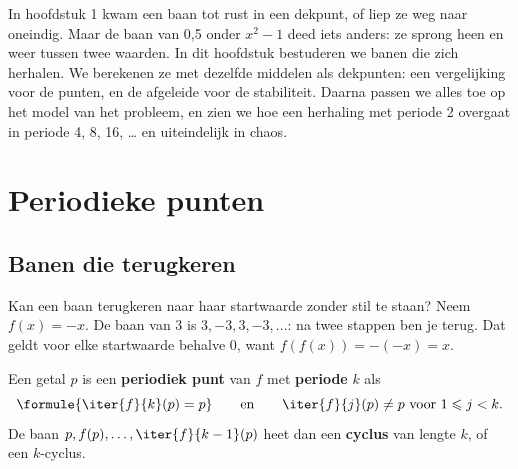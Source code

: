 
In hoofdstuk 1 kwam een baan tot rust in een dekpunt, of liep ze weg naar oneindig. Maar de baan van 0,5 onder $x^2 - 1$ deed iets anders: ze sprong heen en weer tussen twee waarden. In dit hoofdstuk bestuderen we banen die zich herhalen. We berekenen ze met dezelfde middelen als dekpunten: een vergelijking voor de punten, en de afgeleide voor de stabiliteit. Daarna passen we alles toe op het model van het probleem, en zien we hoe een herhaling met periode 2 overgaat in periode 4, 8, 16, \ldots{} en uiteindelijk in chaos.

\begin{oefeningen}[Start]

\end{oefeningen}

\section{Periodieke punten}

\subsection{Banen die terugkeren}

Kan een baan terugkeren naar haar startwaarde zonder stil te staan? Neem $f(x) = -x$. De baan van 3 is $3, -3, 3, -3, \ldots$: na twee stappen ben je terug. Dat geldt voor elke startwaarde behalve 0, want $f(f(x)) = -(-x) = x$.

\begin{theorie}
Een getal $p$ is een \textbf{\textcolor{accent}{periodiek punt}} van $f$ met \textbf{\textcolor{accent}{periode}} $k$ als
\[
\formule{\iter{f}{k}(p) = p} \qquad \text{en} \qquad \iter{f}{j}(p) \neq p \text{ voor } 1 \leqslant j < k .
\]
De baan $p, f(p), \ldots, \iter{f}{k-1}(p)$ heet dan een \textbf{\textcolor{accent}{cyclus}} van lengte $k$, of een $k$-cyclus.
\end{theorie}

